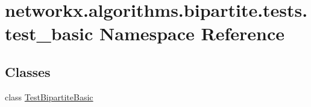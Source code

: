 \hypertarget{namespacenetworkx_1_1algorithms_1_1bipartite_1_1tests_1_1test__basic}{}\section{networkx.\+algorithms.\+bipartite.\+tests.\+test\+\_\+basic Namespace Reference}
\label{namespacenetworkx_1_1algorithms_1_1bipartite_1_1tests_1_1test__basic}
\subsection*{Classes}
\begin{DoxyCompactItemize}
\item 
class \hyperlink{classnetworkx_1_1algorithms_1_1bipartite_1_1tests_1_1test__basic_1_1TestBipartiteBasic}{Test\+Bipartite\+Basic}
\end{DoxyCompactItemize}

